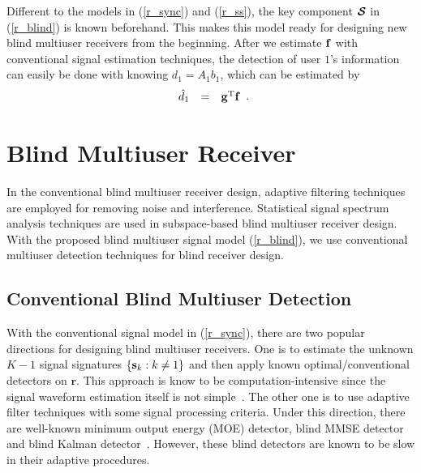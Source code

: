 \documentclass[conference]{IEEEtran}
\newcommand{\br}{{\mathbf r}}
\newcommand{\bg}{{\bf g}}
\newcommand{\bs}{{\bf s}}
\newcommand{\bbf}{{\bf f}}
\newcommand{\bcS}{{\mbox {\boldmath ${\cal S}$}}}
\begin{document}
Different to the models in (\ref{r_sync}) and (\ref{r_ss}), the
key component $\bcS$ in (\ref{r_blind}) is known beforehand. This
makes this model ready for designing new blind multiuser receivers
from the beginning. After we estimate $\bbf$ with conventional
signal estimation techniques, the detection of user $1$'s
information can easily be done with knowing $d_1=A_1b_1$, which
can be estimated by
\begin{equation}
\begin{array}{rcl}
\hat{d}_{1} &=&\bg^{\rm T}\bbf
\end{array}.\label{d_1}
\end{equation}

\section{Blind Multiuser Receiver}
In the conventional blind multiuser receiver design, adaptive
filtering techniques are employed for removing noise and
interference. Statistical signal spectrum analysis techniques are
used in subspace-based blind multiuser receiver design. With the
proposed blind multiuser signal model (\ref{r_blind}), we use
conventional multiuser detection techniques for blind receiver
design.

\subsection{Conventional Blind Multiuser Detection}
With the conventional signal model in (\ref{r_sync}), there are
two popular directions for designing blind multiuser receivers.
One is to estimate the unknown $K-1$ signal signatures
$\left\{\bs_k:k\neq1\right\}$ and then apply known
optimal/conventional detectors on $\br$. This approach is know to
be computation-intensive since the signal waveform estimation
itself is not simple~\cite{Torl97}. The other one is to use
adaptive filter techniques with some signal processing criteria.
Under this direction, there are well-known minimum output energy
(MOE) detector, blind MMSE detector and blind Kalman
detector~\cite{Honi95,Verd98,Zhang02}. However, these blind
detectors are known to be slow in their adaptive procedures.
\end{document}
